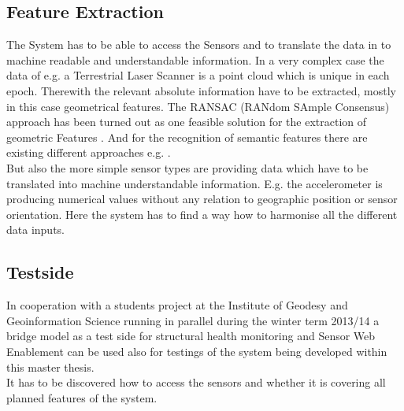 \subsection{Feature Extraction}
The System has to be able to access the Sensors and to translate the data in to machine readable and understandable information. In a very complex case the data of e.g. a Terrestrial Laser Scanner is a point cloud which is unique in each epoch. Therewith the relevant absolute information have to be extracted, mostly in this case geometrical features. The RANSAC (RANdom SAmple Consensus) approach has been turned out as one feasible solution for the extraction of geometric Features \citep{schnabel_efficient_2007}. And for the recognition of semantic features there are existing different approaches e.g. \citep{schnabel_efficient_2010}\citep{gumhold_feature_2001}.\\
But also the more simple sensor types are providing data which have to be translated into machine understandable information. E.g. the accelerometer is producing numerical values without any relation to geographic position or sensor orientation. Here the system has to find a way how to harmonise all the different data inputs.
\subsection{Testside}
In cooperation with a students project at the Institute of Geodesy and Geoinformation Science running in parallel during the winter term 2013/14 a bridge model as a test side for structural health monitoring and Sensor Web Enablement can be used also for testings of the system being developed within this master thesis.\\
It has to be discovered how to access the sensors and whether it is covering all planned features of the system.